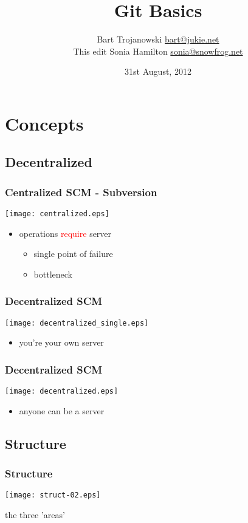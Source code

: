 \documentclass[english]{beamer}
\title{Git Basics}
\author[Bart Trojanowski, Sonia Hamilton]
{Bart Trojanowski \href{mailto:bart@jukie.net}{bart@jukie.net}\\
This edit {Sonia Hamilton \href{mailto:sonia@snowfrog.net}{sonia@snowfrog.net}}}
\institute{Jukie Networks Inc.}
\date{31st August, 2012}
\newcommand{\mysection}[2]{%
  \hypertarget{#2}{}%
  \section{#1}%
  \label{#2}%
}
\newcommand{\mysubsection}[2]{%
  \hypertarget{#2}{}%
  \subsection{#1}%
  \label{#2}%
}
\begin{document}
\label{header}\hypertarget{header}{}
\frame{\maketitle}

\mysection{Concepts}{_concepts}
\mysubsection{Decentralized}{concepts:decentralized}

\begin{frame}
\frametitle{Centralized SCM - Subversion}
\texttt{[image: centralized.eps]}
\begin{itemize}
        \item operations \textcolor{red}{require} server
                \begin{itemize}
                        \item single point of failure
                        \item bottleneck
                \end{itemize}
\end{itemize}
\end{frame}

\begin{frame}
\frametitle{Decentralized SCM}
\texttt{[image: decentralized\_single.eps]}
\begin{itemize}
        \item you're your own server
\end{itemize}
\end{frame}

\begin{frame}
\frametitle{Decentralized SCM}
\texttt{[image: decentralized.eps]}
\begin{itemize}
        \item anyone can be a server
\end{itemize}
\end{frame}

\mysubsection{Structure}{concepts:structure}
\begin{frame}
\frametitle{Structure}

\texttt{[image: struct-02.eps]}
\vspace{\baselineskip}
\begin{center}
        the three 'areas'
\end{center}
\vspace{\textheight}
\end{frame}
\end{document}
